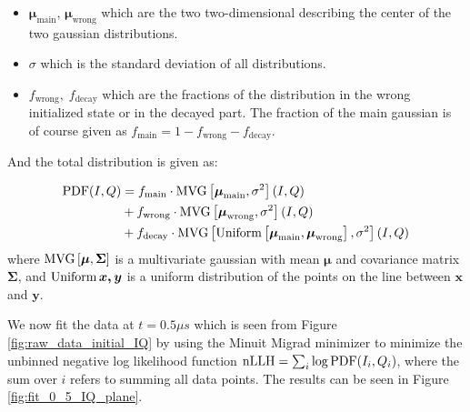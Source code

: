 \begin{itemize}
    \item $\boldsymbol{\mu}_{\text{main}}$, $\boldsymbol{\mu}_{\text{wrong}}$ which are the two two-dimensional describing the center of the two gaussian distributions.
    \item $\sigma$ which is the standard deviation of all distributions.
    \item $f_{\text{wrong}},\; f_{\text{decay}}$ which are the fractions of the distribution in the wrong initialized state or in the decayed part. The fraction of the main gaussian is of course given as $f_{\text{main}} = 1 - f_{\text{wrong}} -f_{\text{decay}}$.
\end{itemize}

\noindent
And the total distribution is given as:

\begin{align}
    \operatorname{PDF}(I, Q) &= f_{\text{main}} \cdot \operatorname{MVG}\left[\boldsymbol{\mu}_{\text{main}}, \sigma^2\right](I, Q) \label{eq:pdf_of_iq_plane_distribution} \\
               &+ f_{\text{wrong}} \cdot \operatorname{MVG}\left[\boldsymbol{\mu}_{\text{wrong}}, \sigma^2\right](I, Q) \nonumber \\
               &+ f_{\text{decay}} \cdot \operatorname{MVG}\left[\operatorname{Uniform}\left[\boldsymbol{\mu}_{\text{main}}, \boldsymbol{\mu}_{\text{wrong}}\right], \sigma^2 \right](I, Q) \nonumber
\end{align}
where $\operatorname{MVG}\left[\boldsymbol{\mu}, \boldsymbol{\Sigma} \right]$ is a multivariate gaussian with mean $\boldsymbol{\mu}$ and covariance matrix $\boldsymbol{\Sigma}$, and $\operatorname{Uniform}{\boldsymbol{x, y}}$ is a uniform distribution of the points on the line between $\boldsymbol{x}$ and $\boldsymbol{y}$.

We now fit the data at $t = 0.5 \mu s$ which is seen from Figure \ref{fig:raw_data_initial_IQ} by using the Minuit Migrad minimizer to minimize the unbinned negative log likelihood function $\operatorname{nLLH} = \sum_i \log \operatorname{PDF}(I_i, Q_i)$, where the sum over $i$ refers to summing all data points. The results can be seen in Figure \ref{fig:fit_0_5_IQ_plane}.

